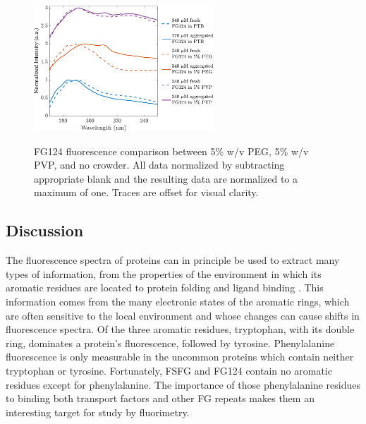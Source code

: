 \begin{figure}
\caption[FG124 fluorescence comparison between crowding agents.]{FG124 fluorescence comparison between 5\% w/v PEG, 5\% w/v PVP, and no crowder.  All data normalized by subtracting appropriate blank and the resulting data are normalized to a maximum of one.  Traces are offset for visual clarity.}
\centering
\includegraphics[width=0.6\textwidth]{figs/ch05/stacked-FG124-fluorimetry.pdf}
\label{fig:stacked-FG124-fluorimetry}
\end{figure}

\subsection{Discussion}

The fluorescence spectra of proteins can in principle be used to extract many types of information, from the properties of the environment in which its aromatic residues are located to protein folding and ligand binding \cite{ladokhin00}.  This information comes from the many electronic states of the aromatic rings, which are often sensitive to the local environment and whose changes can cause shifts in fluorescence spectra.  Of the three aromatic residues, tryptophan, with its double ring, dominates a protein's fluorescence, followed by tyrosine.  Phenylalanine fluorescence is only measurable in the uncommon proteins which contain neither tryptophan or tyrosine.  Fortunately, FSFG and FG124 contain no aromatic residues except for phenylalanine.  The importance of those phenylalanine residues to binding both transport factors and other FG repeats makes them an interesting target for study by fluorimetry.  

